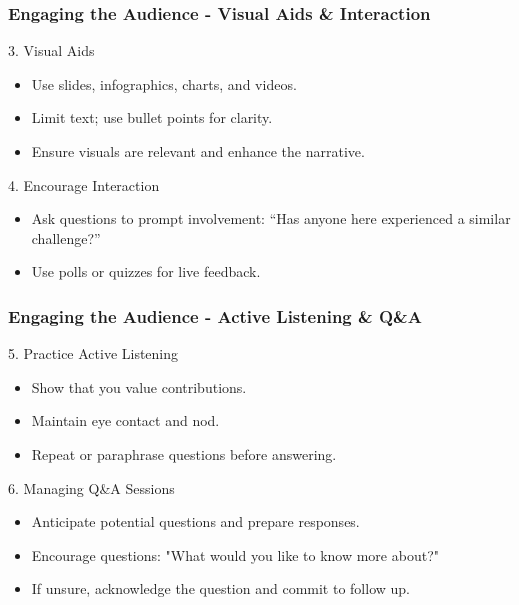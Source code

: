 \documentclass[aspectratio=169]{beamer}
\begin{document}
\begin{frame}[fragile]
    \frametitle{Engaging the Audience - Visual Aids & Interaction}
    \begin{block}{3. Visual Aids}
        \begin{itemize}
            \item Use slides, infographics, charts, and videos.
            \item Limit text; use bullet points for clarity.
            \item Ensure visuals are relevant and enhance the narrative.
        \end{itemize}
    \end{block}
    
    \begin{block}{4. Encourage Interaction}
        \begin{itemize}
            \item Ask questions to prompt involvement: “Has anyone here experienced a similar challenge?”
            \item Use polls or quizzes for live feedback.
        \end{itemize}
    \end{block}
\end{frame}

\begin{frame}[fragile]
    \frametitle{Engaging the Audience - Active Listening & Q\&A}
    \begin{block}{5. Practice Active Listening}
        \begin{itemize}
            \item Show that you value contributions.
            \item Maintain eye contact and nod.
            \item Repeat or paraphrase questions before answering.
        \end{itemize}
    \end{block}
    
    \begin{block}{6. Managing Q\&A Sessions}
        \begin{itemize}
            \item Anticipate potential questions and prepare responses.
            \item Encourage questions: "What would you like to know more about?"
            \item If unsure, acknowledge the question and commit to follow up.
        \end{itemize}
    \end{block}
\end{frame}
\end{document}
